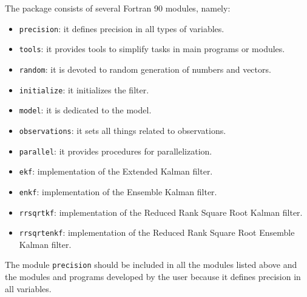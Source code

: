 \documentclass[12pt]{article}
\begin{document}
%
%
%
%
%
%
%

The package consists of several Fortran 90 modules, namely:
\begin{itemize}
\item {\tt precision}: it defines precision in all types of variables.
\item {\tt tools}: it provides tools to simplify tasks in main programs or modules.
\item {\tt random}: it is devoted to random generation of numbers and vectors.
\item {\tt initialize}: it initializes the filter.
\item {\tt model}: it is dedicated to the model.
\item {\tt observations}: it sets all things related to observations.
\item {\tt parallel}: it provides procedures for parallelization.
\item {\tt ekf}: implementation of the Extended Kalman filter.
\item {\tt enkf}: implementation of the Ensemble Kalman filter.
\item {\tt rrsqrtkf}: implementation of the Reduced Rank Square Root Kalman filter.
\item {\tt rrsqrtenkf}: implementation of the Reduced Rank Square Root Ensemble Kal\-man filter.
\end{itemize}

The module {\tt precision} should be included in all the modules listed above and the modules and programs developed by the user because it defines precision in all variables. 
\end{document}
